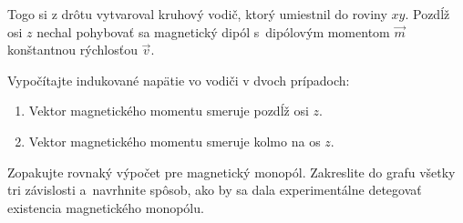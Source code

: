 Togo si z drôtu vytvaroval kruhový vodič, ktorý umiestnil do roviny $xy$.
Pozdĺž osi $z$ nechal pohybovať sa magnetický dipól s~dipólovým momentom $\vec{m}$ konštantnou rýchlosťou $\vec{v}$. 

Vypočítajte indukované napätie vo vodiči v dvoch prípadoch:
\begin{enumerate}[label=\alph*)]
	\item Vektor magnetického momentu smeruje pozdĺž osi $z$.
	\item Vektor magnetického momentu smeruje kolmo na os $z$.
\end{enumerate}

Zopakujte rovnaký výpočet pre magnetický monopól.
Zakreslite do grafu všetky tri závislosti a~navrhnite spôsob,
ako by sa dala experimentálne detegovať existencia magnetického monopólu.
